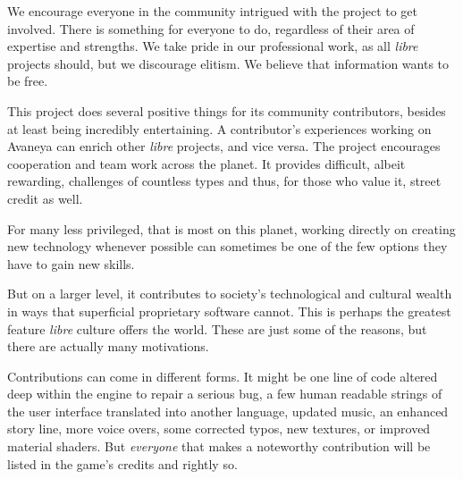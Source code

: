 
We encourage everyone in the community intrigued with the project to get involved. There is something for everyone to do, regardless of their area of expertise and strengths. We take pride in our professional work, as all {\it libre} projects should, but we discourage elitism. We believe that information wants to be free.

    {}

This project does several positive things for its community contributors, besides at least being incredibly entertaining. A contributor's experiences working on Avaneya can enrich other {\it libre} projects, and vice versa. The project encourages cooperation and team work across the planet. It provides difficult, albeit rewarding, challenges of countless types and thus, for those who value it, street credit as well. 

For many less privileged, that is most on this planet, working directly on creating new technology whenever possible can sometimes be one of the few options they have to gain new skills.

But on a larger level, it contributes to society's technological and cultural wealth in ways that superficial proprietary software cannot. This is perhaps the greatest feature {\it libre} culture offers the world. These are just some of the reasons, but there are actually many motivations.


Contributions can come in different forms. It might be one line of code altered deep within the engine to repair a serious bug, a few human readable strings of the user interface translated into another language, updated music, an enhanced story line, more voice overs, some corrected typos, new textures, or improved material shaders. But {\it everyone} that makes a noteworthy contribution will be listed in the game's credits and rightly so.

